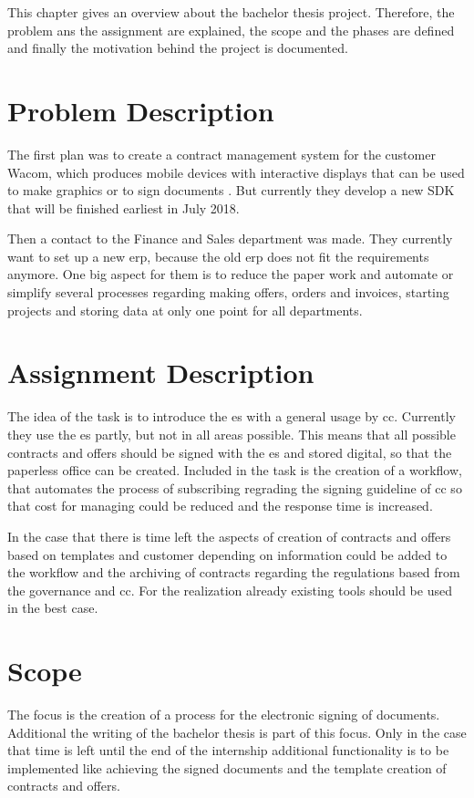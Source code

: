  This chapter gives an overview about the bachelor thesis project. Therefore, the problem ans the assignment are explained, the scope and the phases are defined and finally the motivation behind the project is documented.
 
 \section{Problem Description}
 The first plan was to create a contract management system for the customer Wacom, which produces mobile devices with interactive displays that can be used to make graphics or to sign documents \parencite{wacom2018about}. But currently they develop a new \gls{SDK} that will be finished earliest in July 2018.
 
 Then a contact to the Finance and Sales department was made. They currently want to set up a new \gls{erp}, because the old \gls{erp} does not fit the requirements anymore. One big aspect for them is to reduce the paper work and automate or simplify several processes regarding making offers, orders and invoices, starting projects and storing data at only one point for all departments.

 \section{Assignment Description}
 The idea of the task is to introduce the \gls{es} with a general usage by \gls{cc}. Currently they use the \gls{es} partly, but not in all areas possible.
 This means that all possible contracts and offers should be signed with the \gls{es} and stored digital, so that the paperless office can be created. Included in the task is the creation of a workflow, that automates the process of subscribing regrading the signing guideline of \gls{cc} so that cost for managing could be reduced and the response time is increased.
 
 In the case that there is time left the aspects of creation of contracts and offers based on templates and customer depending on information could be added to the workflow and the archiving of contracts regarding the regulations based from the governance and \gls{cc}. For the realization already existing tools should be used in the best case.
 
 \section{Scope}
 The focus is the creation of a process for the electronic signing of documents. Additional the writing of the bachelor thesis is part of this focus. Only in the case that time is left until the end of the internship additional functionality is to be implemented like achieving the signed documents and the template creation of contracts and offers.
 
